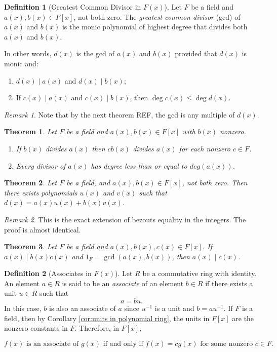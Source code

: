\documentclass{article}
\newtheorem{theorem}{Theorem}[section]
\theoremstyle{definition}
\newtheorem{definition}{Definition}[section]
\theoremstyle{remark}
\newtheorem{remark}{Remark}[section]
\begin{document}
\begin{definition}[Greatest Common Divisor in $F(x)$]
Let $F$ be a field and $a(x), b(x) \in F[x]$, not both zero. The \textit{greatest common divisor} (gcd) of $a(x)$ and $b(x)$ is the monic polynomial of highest degree that divides both $a(x)$ and $b(x)$. 

In other words, $d(x)$ is the gcd of $a(x)$ and $b(x)$ provided that $d(x)$ is monic and:
\begin{enumerate}
\item $d(x) \mid a(x)$ and $d(x) \mid b(x)$;
\item If $c(x) \mid a(x)$ and $c(x) \mid b(x)$, then $\deg c(x) \leq \deg d(x)$.
\end{enumerate}
\end{definition}
\begin{remark}
Note that by the next theorem REF, the gcd is any multiple of $d(x)$.
\end{remark}



\begin{theorem}
Let $F$ be a field and $a(x), b(x) \in F[x]$ with $b(x)$ nonzero.
\begin{enumerate}
    \item If $b(x)$ divides $a(x)$ then $cb(x)$ divides $a(x)$ for each nonzero $c \in F$.
    \item Every divisor of $a(x)$ has degree less than or equal to $deg(a(x))$.
\end{enumerate}
\end{theorem}



\begin{theorem}
Let $F$ be a field, and $a(x),b(x)\in F[x]$, not both zero. Then there
exists polynomials $u(x)$ and $v(x)$ such that $d(x) = a(x)u(x) + b(x)v(x)$.
\end{theorem}
\begin{remark}
This is the exact extension of bezouts equality in the integers. The proof is almost identical. 
\end{remark}



\begin{theorem} \label{thm:relatively prime divisibility}
Let $F$ be a field and $a(x), b(x), c(x) \in F[x]$. If $a(x) \mid b(x)c(x)$ and $1_F = \gcd(a(x), b(x))$, then $a(x) \mid c(x)$.
\end{theorem}

\begin{definition}[Associates in $F(x)$]
Let $R$ be a commutative ring with identity. An element $a \in R$ is said to be an \textit{associate} of an element $b \in R$ if there exists a unit $u \in R$ such that
\[
a = bu.
\]
In this case, $b$ is also an associate of $a$ since $u^{-1}$ is a unit and $b = au^{-1}$.
If $F$ is a field, then by Corollary \ref{cor:units in polynomial ring}, the units in $F[x]$ are the nonzero constants in $F$. Therefore, in $F[x]$,

\[
f(x) \text{ is an associate of } g(x) \text{ if and only if } f(x) = c g(x) \text{ for some nonzero } c \in F.
\]

\end{definition}
\end{document}
